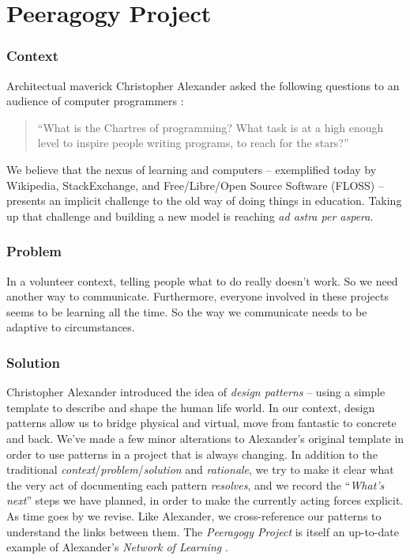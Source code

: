\section{Peeragogy Project}\label{sec:Peeragogy_Project}

\subsubsection*{Context}  Architectual maverick Christopher Alexander asked the following questions to an audience of computer programmers \cite{alexander1999origins}: 
\begin{quote}
``What is the Chartres of programming? What task is at a high enough level to inspire people writing programs, to reach for the stars?''
\end{quote}
We believe that the nexus of learning and computers -- exemplified today by Wikipedia, StackExchange, and Free/Libre/Open Source Software (FLOSS) -- presents an implicit challenge to the old way of doing things in education.  Taking up that challenge and building a new model is reaching \emph{ad astra per aspera}.  

\subsubsection*{Problem} In a volunteer context, telling people what to do really doesn't work.  So we need another way to communicate.  Furthermore, everyone involved in these projects seems to be learning all the time.  So the way we communicate needs to be adaptive to circumstances.

\subsubsection*{Solution} Christopher Alexander introduced the idea of \emph{design patterns} -- using a simple template to describe and shape the human life world.  In our context, design patterns allow us to bridge physical and virtual, move from fantastic to concrete and back.  We've made a few minor alterations to Alexander's original template in order to use patterns in a project that is always changing.  In addition to the traditional \emph{context}/\emph{problem}/\emph{solution} and \emph{rationale}, we try to make it clear what the very act of documenting each pattern \emph{resolves}, and we record the ``\emph{What's next}'' steps we have planned, in order to make the currently acting forces explicit. As time goes by we revise.  Like Alexander, we cross-reference our patterns to understand the links between them. The \emph{Peeragogy Project} is itself an up-to-date example of Alexander's \emph{Network of Learning} \cite[p. 99]{alexander1977pattern}.

